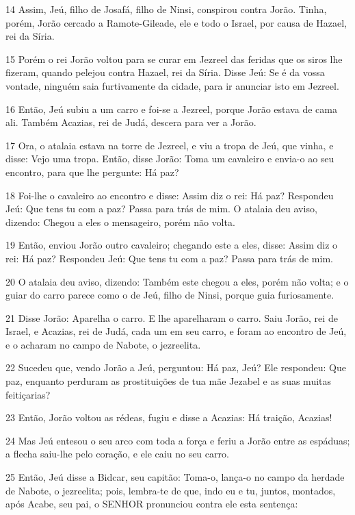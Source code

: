 \par 14 Assim, Jeú, filho de Josafá, filho de Ninsi, conspirou contra Jorão. Tinha, porém, Jorão cercado a Ramote-Gileade, ele e todo o Israel, por causa de Hazael, rei da Síria.
\par 15 Porém o rei Jorão voltou para se curar em Jezreel das feridas que os siros lhe fizeram, quando pelejou contra Hazael, rei da Síria. Disse Jeú: Se é da vossa vontade, ninguém saia furtivamente da cidade, para ir anunciar isto em Jezreel.
\par 16 Então, Jeú subiu a um carro e foi-se a Jezreel, porque Jorão estava de cama ali. Também Acazias, rei de Judá, descera para ver a Jorão.
\par 17 Ora, o atalaia estava na torre de Jezreel, e viu a tropa de Jeú, que vinha, e disse: Vejo uma tropa. Então, disse Jorão: Toma um cavaleiro e envia-o ao seu encontro, para que lhe pergunte: Há paz?
\par 18 Foi-lhe o cavaleiro ao encontro e disse: Assim diz o rei: Há paz? Respondeu Jeú: Que tens tu com a paz? Passa para trás de mim. O atalaia deu aviso, dizendo: Chegou a eles o mensageiro, porém não volta.
\par 19 Então, enviou Jorão outro cavaleiro; chegando este a eles, disse: Assim diz o rei: Há paz? Respondeu Jeú: Que tens tu com a paz? Passa para trás de mim.
\par 20 O atalaia deu aviso, dizendo: Também este chegou a eles, porém não volta; e o guiar do carro parece como o de Jeú, filho de Ninsi, porque guia furiosamente.
\par 21 Disse Jorão: Aparelha o carro. E lhe aparelharam o carro. Saiu Jorão, rei de Israel, e Acazias, rei de Judá, cada um em seu carro, e foram ao encontro de Jeú, e o acharam no campo de Nabote, o jezreelita.
\par 22 Sucedeu que, vendo Jorão a Jeú, perguntou: Há paz, Jeú? Ele respondeu: Que paz, enquanto perduram as prostituições de tua mãe Jezabel e as suas muitas feitiçarias?
\par 23 Então, Jorão voltou as rédeas, fugiu e disse a Acazias: Há traição, Acazias!
\par 24 Mas Jeú entesou o seu arco com toda a força e feriu a Jorão entre as espáduas; a flecha saiu-lhe pelo coração, e ele caiu no seu carro.
\par 25 Então, Jeú disse a Bidcar, seu capitão: Toma-o, lança-o no campo da herdade de Nabote, o jezreelita; pois, lembra-te de que, indo eu e tu, juntos, montados, após Acabe, seu pai, o SENHOR pronunciou contra ele esta sentença:
